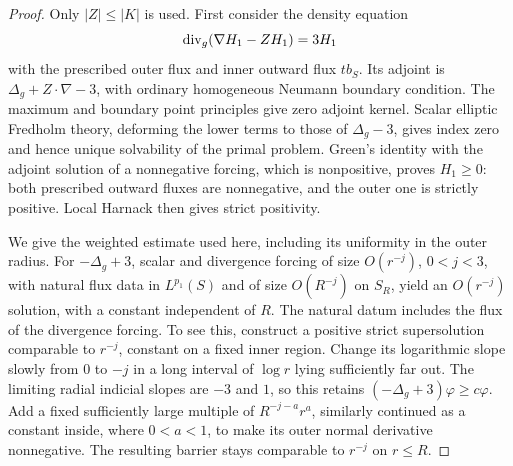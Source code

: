 \begin{proof}
Only \(|Z|\le |K|\) is used.  First consider the density equation
\begin{equation}\label{eq:ah-homogeneous-lapse}
 \operatorname{div}_g(\nabla H_1-ZH_1)=3H_1
\end{equation}
with the prescribed outer flux and inner outward flux \(t b_S\).
Its adjoint is \(\Delta_g+Z\cdot\nabla-3\), with ordinary
homogeneous Neumann boundary condition.  The maximum and boundary
point principles give zero adjoint kernel.  Scalar elliptic
Fredholm theory, deforming the lower terms to those of
\(\Delta_g-3\), gives index zero and hence unique solvability of
the primal problem.  Green's identity with the adjoint solution
of a nonnegative forcing, which is nonpositive, proves
\(H_1\ge0\): both prescribed outward fluxes are nonnegative, and
the outer one is strictly positive.  Local Harnack then gives
strict positivity.

We give the weighted estimate used here, including its uniformity
in the outer radius.  For \(-\Delta_g+3\), scalar and divergence
forcing of size \(O(r^{-j})\), \(0<j<3\), with natural flux data
in \(L^{p_1}(S)\) and of size \(O(R^{-j})\) on \(S_R\), yield
an \(O(r^{-j})\) solution, with a constant independent of \(R\).
The natural datum includes the flux of the divergence forcing.
To see this, construct a positive strict supersolution comparable
to \(r^{-j}\), constant on a fixed inner region.  Change its
logarithmic slope slowly from \(0\) to \(-j\) in a long interval
of \(\log r\) lying sufficiently far out.  The limiting radial
indicial slopes are \(-3\) and \(1\), so this retains
\((-\Delta_g+3)\varphi\ge c\varphi\).  Add a fixed sufficiently
large multiple of
\(R^{-j-a}r^a\), similarly continued as a constant inside, where
\(0<a<1\), to make its outer normal derivative nonnegative.
The resulting barrier stays comparable to \(r^{-j}\) on \(r\le R\).


\end{proof}
